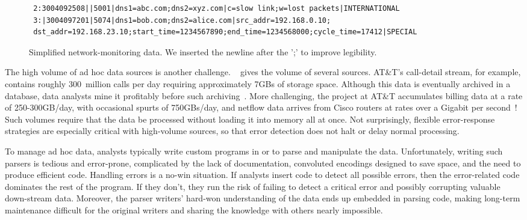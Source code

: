 \begin{figure*}
  \centering
  \small
\begin{verbatim}
 2:3004092508||5001|dns1=abc.com;dns2=xyz.com|c=slow link;w=lost packets|INTERNATIONAL
 3:|3004097201|5074|dns1=bob.com;dns2=alice.com|src_addr=192.168.0.10;
 dst_addr=192.168.23.10;start_time=1234567890;end_time=1234568000;cycle_time=17412|SPECIAL
\end{verbatim}  
  \caption{Simplified network-monitoring data. We inserted the newline
    after the ';' to improve legibility.}
  \label{fig:darkstar-records1}
\end{figure*}


The high volume of ad hoc data sources is another challenge.
~ gives the volume of several sources.
AT\&T's call-detail stream, for example, contains roughly 300~million
calls per day requiring approximately 7GBs of storage space.  Although
this data is eventually archived in a database, data analysts mine it
profitably before such archiving~\cite{kdd98,kdd99}.  More
challenging, the \ningaui{} project at AT\&T accumulates billing data
at a rate of 250-300GB/day, with occasional spurts of 750GBs/day, and
netflow data arrives from Cisco routers at rates over a Gigabit per
second~\cite{gigascope}!  Such volumes require that the data be
processed without loading it into memory all at once.  Not
surprisingly, flexible error-response strategies are especially
critical with high-volume sources, so that error detection does not
halt or delay normal processing.


To manage ad hoc data, analysts typically write custom programs in
\C{} or \perl{} to parse and manipulate the data. 
Unfortunately, writing such parsers is tedious and error-prone,
complicated by the lack of documentation, convoluted encodings
designed to save space, and the need to produce efficient code.
Handling errors is a no-win situation.  If analysts insert code
to detect all possible errors, then the error-related code dominates
the rest of the program. If they don't, they run the risk of
failing to detect a critical error and possibly corrupting valuable
down-stream data.  Moreover, the parser writers'
hard-won understanding of the data ends up embedded in parsing code,
making long-term maintenance difficult for the original writers and
sharing the knowledge with others nearly impossible.

